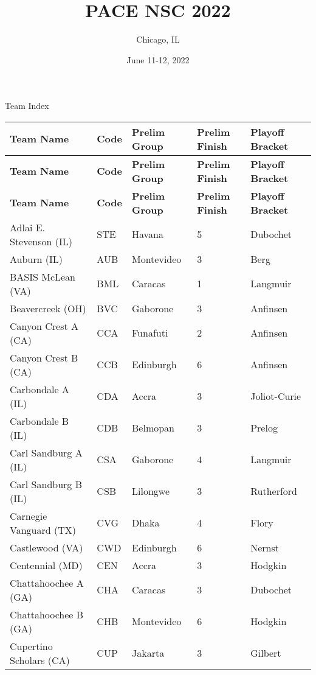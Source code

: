 \documentclass{article}%
\title{PACE NSC 2022}%
\author{Chicago, IL}%
\date{June 11{-}12, 2022}%
\begin{document}
%
\normalsize%
%
\maketitle%
\vspace*{48pt}%
\begin{center}%
\begin{Huge}%
Team Index%
\end{Huge}%
\end{center}%
\newpage%
%
%
\begin{longtable}{|ll|ll|l|}%
\rowcolor{gray!30}%
\hline%
\textbf{Team Name} & \textbf{Code}&\textbf{Prelim Group}&\textbf{Prelim Finish}&\textbf{Playoff Bracket}\\%
\hline%
\endhead%
\hline%
\rowcolor{gray!25}%
\textbf{Team Name} & \textbf{Code}&\textbf{Prelim Group}&\textbf{Prelim Finish}&\textbf{Playoff Bracket}\\%
\hline%
\endfoot%
\hline%
\hline\rowcolor{gray!25}%
\textbf{Team Name} & \textbf{Code}&\textbf{Prelim Group}&\textbf{Prelim Finish}&\textbf{Playoff Bracket}\\%
\hline%
\endlastfoot%
\hline%
Adlai E. Stevenson (IL)&STE&Havana&5&Dubochet\\%
Auburn (IL)&AUB&Montevideo&3&Berg\\%
BASIS McLean (VA)&BML&Caracas&1&Langmuir\\%
Beavercreek (OH)&BVC&Gaborone&3&Anfinsen\\%
Canyon Crest A (CA)&CCA&Funafuti&2&Anfinsen\\%
Canyon Crest B (CA)&CCB&Edinburgh&6&Anfinsen\\%
Carbondale A (IL)&CDA&Accra&3&Joliot{-}Curie\\%
Carbondale B (IL)&CDB&Belmopan&3&Prelog\\%
Carl Sandburg A (IL)&CSA&Gaborone&4&Langmuir\\%
Carl Sandburg B (IL)&CSB&Lilongwe&3&Rutherford\\%
Carnegie Vanguard (TX)&CVG&Dhaka&4&Flory\\%
Castlewood (VA)&CWD&Edinburgh&6&Nernst\\%
Centennial (MD)&CEN&Accra&3&Hodgkin\\%
Chattahoochee A (GA)&CHA&Caracas&3&Dubochet\\%
Chattahoochee B (GA)&CHB&Montevideo&6&Hodgkin\\%
Cupertino Scholars (CA)&CUP&Jakarta&3&Gilbert\\%

\end{longtable}
\end{document}

